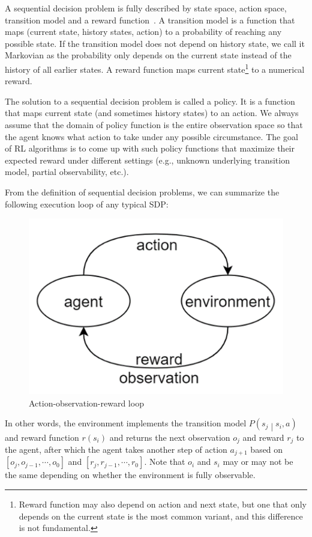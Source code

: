 A sequential decision problem is fully described by state space, action space, transition model and a reward function~\cite{russell}. A transition model is a function that maps (current state, history states, action) to a probability of reaching any possible state. If the transition model does not depend on history state, we call it Markovian as the probability only depends on the current state instead of the history of all earlier states. A reward function maps current state\footnote{Reward function may also depend on action and next state, but one that only depends on the current state is the most common variant, and this difference is not fundamental.} to a numerical reward.

The solution to a sequential decision problem is called a policy. It is a function that maps current state (and sometimes history states) to an action. We always assume that the domain of policy function is the entire observation space so that the agent knows what action to take under any possible circumstance. The goal of RL algorithms is to come up with such policy functions that maximize their expected reward under different settings (e.g., unknown underlying transition model, partial observability, etc.).

From the definition of sequential decision problems, we can summarize the following execution loop of any typical SDP:

\begin{figure}[htp]
    \centering
    \includegraphics{images/obr-loop.png}
    \caption{Action-observation-reward loop}
    \label{fig:obr-loop}
\end{figure}

In other words, the environment implements the transition model $P\left(s_j\middle| s_i,a\right)$ and reward function $r\left(s_i\right)$ and returns the next observation $o_j$ and reward $r_j$ to the agent, after which the agent takes another step of action $a_{j+1}$ based on $\left[o_j,o_{j-1},\cdots,o_0\right]$ and $\left[r_j,r_{j-1},\cdots,r_0\right]$. Note that $o_i$ and $s_i$ may or may not be the same depending on whether the environment is fully observable.

